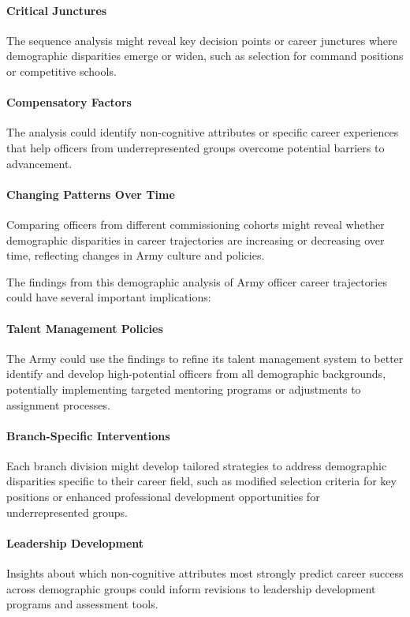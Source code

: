 \documentclass[../main.tex]{subfiles}
\begin{document}
\paragraph{Critical Junctures}
The sequence analysis might reveal key decision points or career junctures where demographic disparities emerge or widen, such as selection for command positions or competitive schools.

\paragraph{Compensatory Factors}
The analysis could identify non-cognitive attributes or specific career experiences that help officers from underrepresented groups overcome potential barriers to advancement.

\paragraph{Changing Patterns Over Time}
Comparing officers from different commissioning cohorts might reveal whether demographic disparities in career trajectories are increasing or decreasing over time, reflecting changes in Army culture and policies.


The findings from this demographic analysis of Army officer career trajectories could have several important implications:

\paragraph{Talent Management Policies}
The Army could use the findings to refine its talent management system to better identify and develop high-potential officers from all demographic backgrounds, potentially implementing targeted mentoring programs or adjustments to assignment processes.

\paragraph{Branch-Specific Interventions}
Each branch division might develop tailored strategies to address demographic disparities specific to their career field, such as modified selection criteria for key positions or enhanced professional development opportunities for underrepresented groups.

\paragraph{Leadership Development}
Insights about which non-cognitive attributes most strongly predict career success across demographic groups could inform revisions to leadership development programs and assessment tools.
\end{document}
